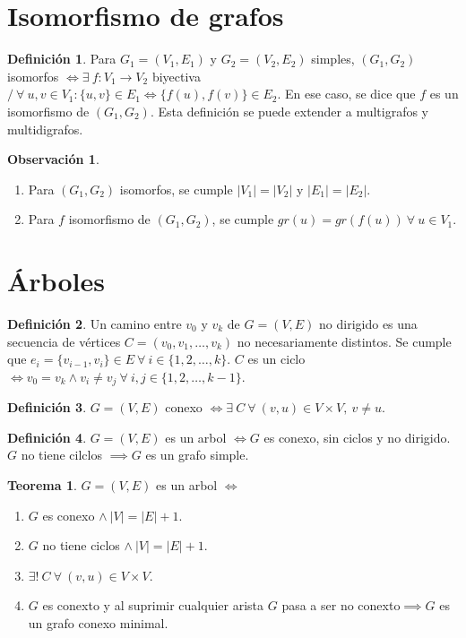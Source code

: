 \documentclass[10pt,a4paper]{article}
\theoremstyle{definition}
\newtheorem{definition}{Definición}[section]
\newtheorem{theorem}{Teorema}[section]
\newtheorem{obs}{Observación}[section]
\begin{document}
\section{Isomorfismo de grafos}
\begin{definition}
	Para $G_1=(V_1,E_1)$ y $G_2=(V_2,E_2)$ simples, $(G_1,G_2)$ isomorfos $\iff \exists\:f:V_1 \to V_2$ biyectiva $/\:\forall\:u,v\in V_1 : \{u,v\}\in E_1 \iff \{f(u),f(v)\}\in E_2$. En ese caso, se dice que $f$ es un isomorfismo de $(G_1,G_2)$. Esta definición se puede extender a multigrafos y multidigrafos.
\end{definition}
\begin{obs}\phantom{}
\begin{enumerate}
	\item Para $(G_1,G_2)$ isomorfos, se cumple $|V_1| = |V_2|$ y $|E_1| = |E_2|$.
	\item Para $f$ isomorfismo de $(G_1, G_2)$, se cumple $gr(u) = gr(f(u))\:\forall\:u\in V_1$.
\end{enumerate}
\end{obs}
\section{Árboles}
\begin{definition}
	Un camino entre $v_0$ y $v_k$ de $G=(V,E)$ no dirigido es una secuencia de vértices $C=(v_0,v_1,\dots,v_k)$ no necesariamente distintos. Se cumple que $e_i=\{v_{i-1},v_i\}\in E\:\forall\:i\in\{1,2,\dots,k\}$. $C$ es un ciclo $\iff v_0 = v_k \land v_i\neq v_j\:\forall\:i,j\in\{1,2,\dots,k-1\}$.
\end{definition}
\begin{definition}
	$G=(V,E)$ conexo $\iff\exists\:C\:\forall\:(v,u)\in V\times V,\:v\neq u$.
\end{definition}
\begin{definition}
	$G=(V,E)$ es un arbol $\iff G$ es conexo, sin ciclos y no dirigido. $G$ no tiene cilclos $\implies G$ es un grafo simple.
\end{definition}
\begin{theorem}
$G=(V,E)$ es un arbol $\iff$
\begin{enumerate}
\item $G$ es conexo $\land\:|V| = |E| +1$.
\item $G$ no tiene ciclos $\land\:|V| = |E| +1$.
\item $\exists!\:C\:\forall\:(v,u)\in V\times V$.
\item $G$ es conexto y al suprimir cualquier arista $G$ pasa a ser no conexto$\implies G$ es un grafo conexo minimal.
\end{enumerate}
\end{theorem}
\end{document}
